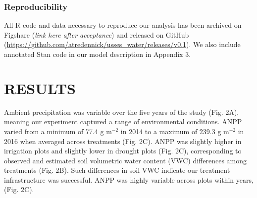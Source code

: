 \documentclass[fleqn,10pt,lineno]{wlpeerj} %
\begin{document}

\subsubsection{Reproducibility}\label{reproducibility}

All R code and data necessary to reproduce our analysis has been
archived on Figshare (\emph{link here after acceptance}) and released on
GitHub (\url{https://github.com/atredennick/usses_water/releases/v0.1}).
We also include annotated Stan code in our model description in Appendix
3.

\section{RESULTS}\label{results}

Ambient precipitation was variable over the five years of the study
(Fig. 2A), meaning our experiment captured a range of environmental
conditions. ANPP varied from a minimum of 77.4 g m\(^{-2}\) in 2014 to a
maximum of 239.3 g m\(^{-2}\) in 2016 when averaged across treatments
(Fig. 2C). ANPP was slightly higher in irrigation plots
 and slightly lower in drought plots
 (Fig. 2C),
corresponding to observed and estimated soil volumetric water content
(VWC) differences among treatments (Fig. 2B).
Such differences in soil VWC indicate our treatment infrastructure was
successful. ANPP was highly variable across plots within years,
(Fig. 2C).
\end{document}
